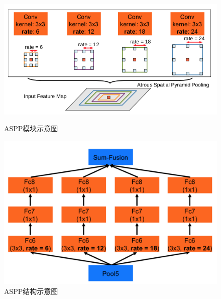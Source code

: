 \documentclass[cn]{elegantbook}
\begin{document}
\begin{figure}[!h]
	\centering
	\begin{minipage}[t]{0.4\textwidth}
		\centering
		\includegraphics[width=\textwidth]{images/aspp1.png}
		\caption{\label{aspp1}ASPP模块示意图}
	\end{minipage}
	\begin{minipage}[t]{0.4\textwidth}
		\centering
		\includegraphics[width=\textwidth]{images/aspp2.png}
		\caption{\label{aspp2}ASPP结构示意图}
	\end{minipage}
\end{figure}
\end{document}
